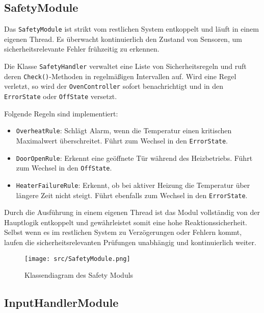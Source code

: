 \documentclass[a4paper,12pt]{article}
\begin{document}
\newpage

\subsection*{SafetyModule}

Das \texttt{SafetyModule} ist strikt vom restlichen System entkoppelt und läuft in einem eigenen Thread. Es überwacht kontinuierlich den Zustand von Sensoren, um sicherheitsrelevante Fehler frühzeitig zu erkennen.

Die Klasse \texttt{SafetyHandler} verwaltet eine Liste von Sicherheitsregeln und ruft deren \texttt{Check()}-Methoden in regelmäßigen Intervallen auf. Wird eine Regel verletzt, so wird der \texttt{OvenController} sofort benachrichtigt und in den \texttt{ErrorState} oder \texttt{OffState} versetzt.

Folgende Regeln sind implementiert:

\begin{itemize}
    \item \texttt{OverheatRule}: Schlägt Alarm, wenn die Temperatur einen kritischen Maximalwert überschreitet. Führt zum Wechsel in den \texttt{ErrorState}.
    \item \texttt{DoorOpenRule}: Erkennt eine geöffnete Tür während des Heizbetriebs. Führt zum Wechsel in den \texttt{OffState}.
    \item \texttt{HeaterFailureRule}: Erkennt, ob bei aktiver Heizung die Temperatur über längere Zeit nicht steigt. Führt ebenfalls zum Wechsel in den \texttt{ErrorState}.
\end{itemize}

Durch die Ausführung in einem eigenen Thread ist das Modul vollständig von der Hauptlogik entkoppelt und gewährleistet somit eine hohe Reaktionssicherheit. Selbst wenn es im restlichen System zu Verzögerungen oder Fehlern kommt, laufen die sicherheitsrelevanten Prüfungen unabhängig und kontinuierlich weiter.

\begin{figure}[h!]
  \centering
  \texttt{[image: src/SafetyModule.png]}
  \caption{Klassendiagram des Safety Moduls}
  \label{fig:safetymodule}
\end{figure}

\newpage

\subsection*{InputHandlerModule}
\end{document}

